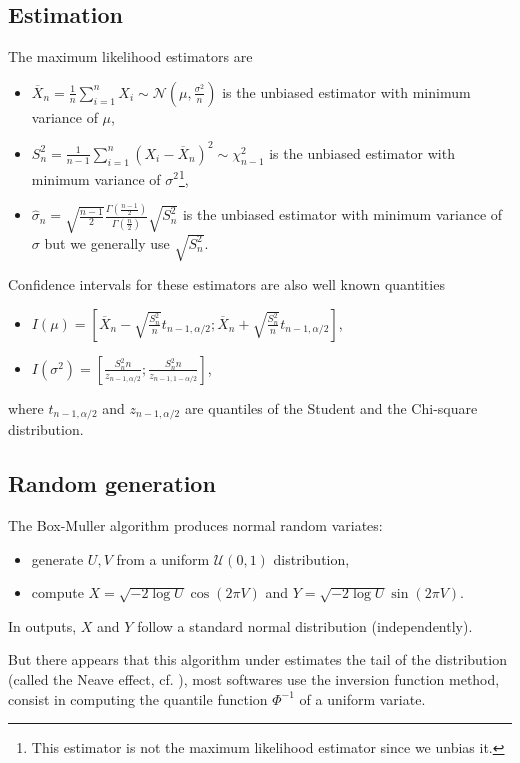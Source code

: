 \subsection{Estimation}
The maximum likelihood estimators are 
\begin{itemize}
\item $ \overline X_n = \frac{1}{n} \sum_{i=1}^n X_i \sim \mathcal N(\mu, \frac{\sigma^2}{n})$ is the unbiased estimator with minimum variance of $\mu$,
\item $S^2_n = \frac{1}{n-1} \sum_{i=1}^n (X_i- \overline X_n)^2 \sim \chi_{n-1}^2$ is the unbiased estimator with minimum variance of $\sigma^2$\footnote{This estimator is not the maximum likelihood estimator since we unbias it.},
\item $\hat \sigma_n = \sqrt{\frac{n-1}{2}}\frac{\Gamma(\frac{n-1}{2})}{\Gamma(\frac{n}{2})} \sqrt{S_n^2}$ is the unbiased estimator with minimum variance of $\sigma$ but we generally use $\sqrt{S_n^2}$.
\end{itemize}

Confidence intervals for these estimators are also well known quantities
\begin{itemize}
\item $I(\mu) = \left[\overline X_n - \sqrt{\frac{S_n^2}{n}} t_{n-1,\alpha/2}; \overline X_n + \sqrt{\frac{S_n^2}{n}} t_{n-1,\alpha/2}\right]$,
\item $I(\sigma^2) = \left[\frac{S_n^2 n}{ z_{n-1,\alpha/2}}; \frac{S_n^2n}{ z_{n-1,1-\alpha/2}}\right]$,
\end{itemize}
where $t_{n-1,\alpha/2}$ and $z_{n-1,\alpha/2}$ are quantiles of the Student and the Chi-square distribution.

\subsection{Random generation}
The Box-Muller algorithm produces normal random variates:
\begin{itemize}
\item generate $U,V$ from a uniform $\mathcal U(0,1)$ distribution,
\item compute $X = \sqrt{-2\log U} \cos(2\pi V)$ and $Y = \sqrt{-2\log U} \sin(2\pi V)$.
\end{itemize}
In outputs, $X$ and $Y$ follow a standard normal distribution (independently).

But there appears that this algorithm under estimates the tail of the distribution (called the Neave effect, cf. \cite{patard}), most softwares use the inversion function method, consist in computing the quantile function $\Phi^{-1}$ of a uniform variate.

